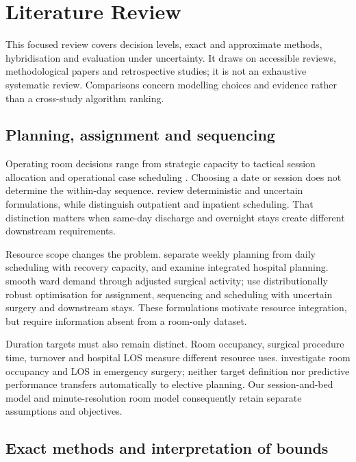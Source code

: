 \section{Literature Review}
\label{sec:literature-review}

This focused review covers decision levels, exact and approximate methods,
hybridisation and evaluation under uncertainty. It draws on accessible
reviews, methodological papers and retrospective studies; it is not an
exhaustive systematic review. Comparisons concern modelling choices and
evidence rather than a cross-study algorithm ranking.

\subsection{Planning, assignment and sequencing}

Operating room decisions range from strategic capacity to tactical session
allocation and operational case scheduling \citep{cardoen2010,guerriero2011}.
Choosing a date or session does not determine the within-day sequence.
\citet{alamin2025} review deterministic and uncertain formulations, while
\citet{wang2021} distinguish outpatient and inpatient scheduling. That
distinction matters when same-day discharge and overnight stays create
different downstream requirements.

Resource scope changes the problem. \citet{fei2010} separate weekly planning
from daily scheduling with recovery capacity, and \citet{rachuba2026} examine
integrated hospital planning. \citet{carter2024} smooth ward demand through
adjusted surgical activity; \citet{shehadeh2026} use distributionally robust
optimisation for assignment, sequencing and scheduling with uncertain surgery
and downstream stays. These formulations motivate resource integration,
but require information absent from a room-only dataset.

Duration targets must also remain distinct. Room occupancy, surgical
procedure time, turnover and hospital LOS measure different resource uses.
\citet{dupre2025} investigate room occupancy and LOS in emergency surgery;
neither target definition nor predictive performance transfers automatically
to elective planning. Our session-and-bed model and minute-resolution room
model consequently retain separate assumptions and objectives.

\subsection{Exact methods and interpretation of bounds}

